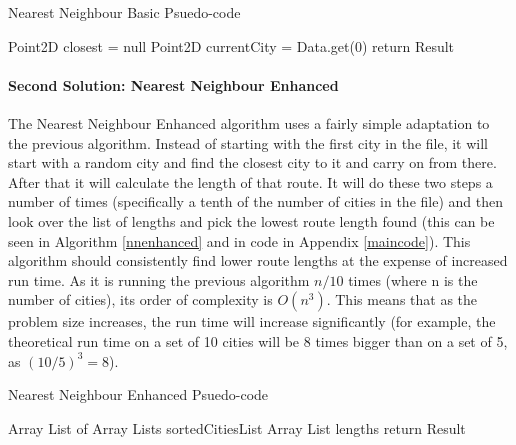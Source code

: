 \documentclass[conference,backref=page]{acmsiggraph}
\begin{document}
\begin{algorithm}[h]
	\caption{Nearest Neighbour Basic Psuedo-code}
	\label{nnbasic}
	Point2D closest = null\;
	Point2D currentCity = Data.get(0)\;
	return Result\;
\end{algorithm}

\paragraph{Second Solution: Nearest Neighbour Enhanced}
The Nearest Neighbour Enhanced algorithm uses a fairly simple adaptation to the previous algorithm. Instead of starting with the first city in the file, it will start with a random city and find the closest city to it and carry on from there. After that it will calculate the length of that route. It will do these two steps a number of times (specifically a tenth of the number of cities in the file) and then look over the list of lengths and pick the lowest route length found (this can be seen in Algorithm \ref{nnenhanced} and in code in Appendix \ref{maincode}). This algorithm should consistently find lower route lengths at the expense of increased run time. As it is running the previous algorithm $n/10$ times (where n is the number of cities), its order of complexity is $O(n^3)$. This means that as the problem size increases, the run time will increase significantly (for example, the theoretical run time on a set of 10 cities will be 8 times bigger than on a set of 5, as $(10/5)^3 = 8$).

\begin{algorithm}[h]
	\caption{Nearest Neighbour Enhanced Psuedo-code}
	\label{nnenhanced}
	Array List of Array Lists sortedCitiesList\;
	Array List lengths\;
	return Result\;
\end{algorithm}
\end{document}

